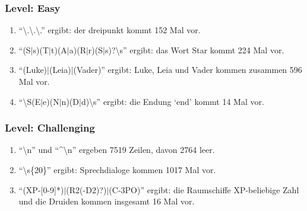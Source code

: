 \documentclass[a4paper, fleqn]{article}
\begin{document}
\subsubsection{Level: Easy}
\begin{enumerate}[label=\alph*)]
    \item ``\textbackslash.\textbackslash.\textbackslash.'' ergibt: der dreipunkt kommt 152 Mal vor.
    \item ``(S$|$s)(T$|$t)(A$|$a)(R$|$r)(S$|$s)?\textbackslash s'' ergibt: das Wort Star kommt 224 Mal vor.
    \item ``(Luke)$|$(Leia)$|$(Vader)'' ergibt: Luke, Leia und Vader kommen zusammen 596 Mal vor.
    \item ``\textbackslash S(E$|$e)(N$|$n)(D$|$d)\textbackslash s'' ergibt: die Endung `end' kommt 14 Mal vor.
\end{enumerate}
\subsubsection{Level: Challenging}
\begin{enumerate}[label=\alph*)]
    \item ``\textbackslash n'' und ``\textasciicircum\textbackslash n'' ergeben 7519 Zeilen, davon 2764 leer.
    \item ``\textbackslash s\{20\}'' ergibt: Sprechdialoge kommen 1017 Mal vor.
    \item ``(XP-[0-9]*)$|$(R2(-D2)?)$|$(C-3PO)'' ergibt: die Raumschiffe XP-beliebige Zahl\\
    und die Druiden kommen insgesamt 16 Mal vor.
\end{enumerate}
\end{document}
